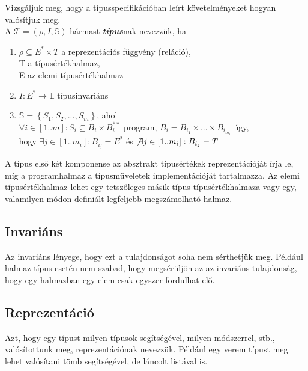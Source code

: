 \documentclass[12pt,margin=0px]{article}
\begin{document}
	\noindent Vizsgáljuk meg, hogy a típusspecifikációban leírt követelményeket hogyan valósítjuk	meg.\\
	
	\noindent A $\mathcal{T}=(\rho,I,\mathbb{S})$ hármast \emph{\textbf{típus}}nak nevezzük, ha

	\begin{enumerate}
		\item $\rho \subseteq E^{*} \times T$ a reprezentációs függvény (reláció),\\
		T a típusértékhalmaz,\\
		E az elemi típusértékhalmaz
		\item $I : E^{*} \to \mathbb{L} $ típusinvariáns
		\item $\mathbb{S} = \left\{ {S_{1},S_{2},...,S_{m}}\right\}$, ahol\\
		$\forall i \in [1..m]: S_{i} \subseteq B_{i} \times B_{i}^{**}$ program, $B_{i} = B_{i_{1}} \times ... \times B_{i_{m_{i}}}$ úgy,\\
		hogy $\exists j \in [1..m_{i}]: B_{i_{j}} = E^{*}$ és $\not \exists j \in [1..m_{i}]: B_{i_{j}} = T$
	\end{enumerate}
	
    \noindent A típus első két komponense az absztrakt típusértékek reprezentációját írja le, míg a programhalmaz a típusműveletek implementációját tartalmazza. Az elemi típusértékhalmaz lehet egy tetszőleges másik típus típusértékhalmaza vagy egy, valamilyen módon definiált legfeljebb megszámolható halmaz.
	
	\subsection*{Invariáns}
	
	Az invariáns lényege, hogy ezt a tulajdonságot soha nem sérthetjük meg. Például halmaz típus esetén nem szabad, hogy megsérüljön
	az az invariáns tulajdonság, hogy egy halmazban egy elem csak egyszer fordulhat elő.
	
	\subsection*{Reprezentáció}
	
	Azt, hogy egy típust milyen típusok segítségével, milyen módszerrel, stb., valósítottunk meg, reprezentációnak nevezzük. Például
	egy verem típust meg lehet valósítani tömb segítségével, de láncolt listával is.\\
	
\end{document}
